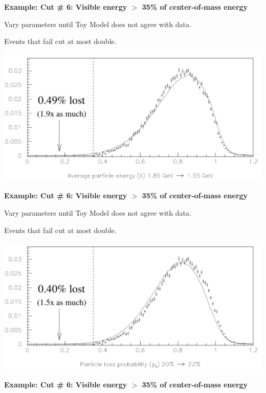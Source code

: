 \documentclass[landscape]{article}
\begin{document}
\pagebreak

{\bf Example: Cut \# 6: Visible energy $>$ 35\% of center-of-mass energy}

\vfill

Vary parameters until Toy Model does not agree with data.

\vfill

Events that fail cut at most double.

\vfill

\includegraphics[width=\linewidth]{toymodel2_revamp.pdf}

\pagebreak

{\bf Example: Cut \# 6: Visible energy $>$ 35\% of center-of-mass energy}

\vfill

Vary parameters until Toy Model does not agree with data.

\vfill

Events that fail cut at most double.

\vfill

\includegraphics[width=\linewidth]{toymodel3_revamp.pdf}

\pagebreak

{\bf Example: Cut \# 6: Visible energy $>$ 35\% of center-of-mass energy}
\end{document}
